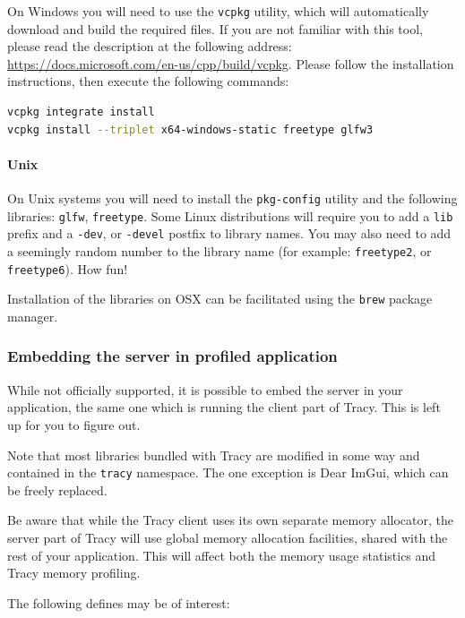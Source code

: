 \documentclass[hidelinks,titlepage,a4paper]{article}
\begin{document}
On Windows you will need to use the \texttt{vcpkg} utility, which will automatically download and build the required files. If you are not familiar with this tool, please read the description at the following address: \url{https://docs.microsoft.com/en-us/cpp/build/vcpkg}. Please follow the installation instructions, then execute the following commands:

\begin{lstlisting}[language=sh]
vcpkg integrate install
vcpkg install --triplet x64-windows-static freetype glfw3
\end{lstlisting}

\paragraph{Unix}

On Unix systems you will need to install the \texttt{pkg-config} utility and the following libraries: \texttt{glfw}, \texttt{freetype}. Some Linux distributions will require you to add a \texttt{lib} prefix and a \texttt{-dev}, or \texttt{-devel} postfix to library names. You may also need to add a seemingly random number to the library name (for example: \texttt{freetype2}, or \texttt{freetype6}). How fun!

Installation of the libraries on OSX can be facilitated using the \texttt{brew} package manager.

\subsubsection{Embedding the server in profiled application}
\label{embeddingserver}

While not officially supported, it is possible to embed the server in your application, the same one which is running the client part of Tracy. This is left up for you to figure out.

Note that most libraries bundled with Tracy are modified in some way and contained in the \texttt{tracy} namespace. The one exception is Dear ImGui, which can be freely replaced.

Be aware that while the Tracy client uses its own separate memory allocator, the server part of Tracy will use global memory allocation facilities, shared with the rest of your application. This will affect both the memory usage statistics and Tracy memory profiling.

The following defines may be of interest:
\end{document}
